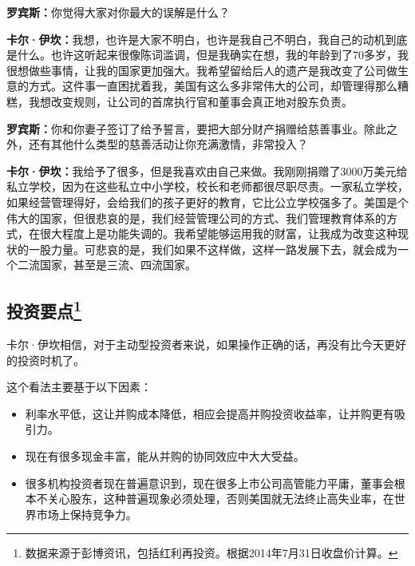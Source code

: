 \begin{BookQuote}
\textbf{罗宾斯：}你觉得大家对你最大的误解是什么？
\end{BookQuote}

\begin{BookQuote}
\textbf{卡尔·伊坎：}我想，也许是大家不明白，也许是我自己不明白，我自己的动机到底是什么。也许这听起来很像陈词滥调，但是我确实在想，我的年龄到了70多岁，我很想做些事情，让我的国家更加强大。我希望留给后人的遗产是我改变了公司做生意的方式。这件事一直困扰着我，美国有这么多非常伟大的公司，却管理得那么糟糕，我想改变规则，让公司的首席执行官和董事会真正地对股东负责。
\end{BookQuote}

\begin{BookQuote}
\textbf{罗宾斯：}你和你妻子签订了给予誓言，要把大部分财产捐赠给慈善事业。除此之外，还有其他什么类型的慈善活动让你充满激情，非常投入？
\end{BookQuote}

\begin{BookQuote}
\textbf{卡尔·伊坎：}我给予了很多，但是我喜欢由自己来做。我刚刚捐赠了3000万美元给私立学校，因为在这些私立中小学校，校长和老师都很尽职尽责。一家私立学校，如果经营管理得好，会给我们的孩子更好的教育，它比公立学校强多了。美国是个伟大的国家，但很悲哀的是，我们经营管理公司的方式、我们管理教育体系的方式，在很大程度上是功能失调的。我希望能够运用我的财富，让我成为改变这种现状的一股力量。可悲哀的是，我们如果不这样做，这样一路发展下去，就会成为一个二流国家，甚至是三流、四流国家。
\end{BookQuote}

\subsection[投资要点]{投资要点\footnote{\label{fn:pdf-32-1}数据来源于彭博资讯，包括红利再投资。根据2014年7月31日收盘价计算。}}

卡尔·伊坎相信，对于主动型投资者来说，如果操作正确的话，再没有比今天更好的投资时机了。

这个看法主要基于以下因素：

\begin{itemize}
\item 利率水平低，这让并购成本降低，相应会提高并购投资收益率，让并购更有吸引力。
\item 现在有很多现金丰富，能从并购的协同效应中大大受益。
\item 很多机构投资者现在普遍意识到，现在很多上市公司高管能力平庸，董事会根本不关心股东，这种普遍现象必须处理，否则美国就无法终止高失业率，在世界市场上保持竞争力。
\end{itemize}

